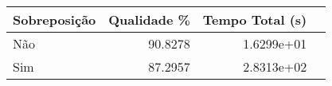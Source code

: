 \begin{tabular}{lrrr}
    \hline
    Sobreposição & Qualidade \% & Tempo Total (s) \\
    \hline
    Não          & 90.8278      & 1.6299e+01      \\
    Sim          & 87.2957      & 2.8313e+02      \\
    \hline
\end{tabular}